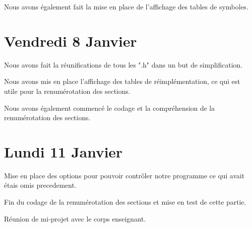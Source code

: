 \documentclass[12pt, a4paper]{article}
\begin{document}
Nous avons également fait la mise en place de l’affichage des tables de symboles.

\section{Vendredi 8 Janvier}

Nous avons fait la réunifications de tous les ".h" dans un but de 
simplification.

Nous avons mis en place l’affichage des tables de r\'eimplémentation, ce qui 
est utile pour la renumérotation des sections.

Nous avons également commencé le codage et la compréhension de la 
renumérotation des sections. 

\section{Lundi 11 Janvier}

Mise en place des options pour pouvoir contrôler notre programme ce qui avait 
étais omis precedement.

Fin du codage de la renumérotation des sections et mise en test de cette partie.

Réunion de mi-projet avec le corps enseignant.
\end{document}

